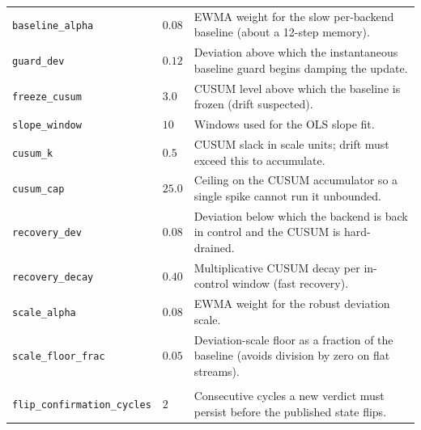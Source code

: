 \begin{table}[htbp]
\begin{tabularx}{\linewidth}{@{}l l Y@{}}
    \texttt{baseline\_alpha}   & $0.08$ & EWMA weight for the slow per-backend baseline (about a 12-step memory). \\
    \texttt{guard\_dev}        & $0.12$ & Deviation above which the instantaneous baseline guard begins damping the update. \\
    \texttt{freeze\_cusum}     & $3.0$  & CUSUM level above which the baseline is frozen (drift suspected). \\
    \texttt{slope\_window}     & $10$   & Windows used for the OLS slope fit. \\
    \texttt{cusum\_k}          & $0.5$  & CUSUM slack in scale units; drift must exceed this to accumulate. \\
    \texttt{cusum\_cap}        & $25.0$ & Ceiling on the CUSUM accumulator so a single spike cannot run it unbounded. \\
    \texttt{recovery\_dev}     & $0.08$ & Deviation below which the backend is back in control and the CUSUM is hard-drained. \\
    \texttt{recovery\_decay}   & $0.40$ & Multiplicative CUSUM decay per in-control window (fast recovery). \\
    \texttt{scale\_alpha}      & $0.08$ & EWMA weight for the robust deviation scale. \\
    \texttt{scale\_floor\_frac}& $0.05$ & Deviation-scale floor as a fraction of the baseline (avoids division by zero on flat streams). \\
    \addlinespace
     \\
    \texttt{flip\_confirmation\_cycles} & $2$ & Consecutive cycles a new verdict must persist before the published state flips. \\
    \bottomrule
  \end{tabularx}
\end{table}
